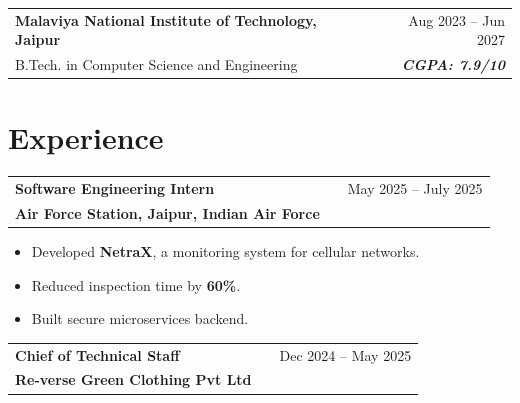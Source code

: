 \documentclass[a4paper,10pt]{article}
\begin{document}
\vspace{-2pt}



\begin{tabularx}{\linewidth}{ @{}l X r@{} }

\color[HTML]{1C033C} \textbf{Malaviya National Institute of Technology, Jaipur} & \hfill & \color[HTML]{371e77} Aug 2023 -- Jun 2027 \\

\color[HTML]{371e77} B.Tech. in Computer Science and Engineering & \hfill & \color[HTML]{4B28A4} \textit{\textbf{CGPA: 7.9/10}} \\

\end{tabularx}




\section{Experience}



\begin{tabularx}{\linewidth}{ @{}l X r@{} }

\textbf{Software Engineering Intern} & \hfill & \textcolor[HTML]{371e77}{May 2025 -- July 2025} \\

\textcolor[HTML]{371e77}{\textbf{Air Force Station, Jaipur, Indian Air Force}} & & \\

\end{tabularx}

\vspace{-6pt}

\begin{itemize}[nosep, leftmargin=1.5em]

\item Developed \textbf{NetraX}, a monitoring system for cellular networks.

\item Reduced inspection time by \textbf{60\%}.

\item Built secure microservices backend.

\end{itemize}



\begin{tabularx}{\linewidth}{ @{}l X r@{} }

\textbf{Chief of Technical Staff} & \hfill & \textcolor[HTML]{371e77}{Dec 2024 -- May 2025} \\

\textcolor[HTML]{371e77}{\textbf{Re-verse Green Clothing Pvt Ltd}} & & \\

\end{tabularx}
\end{document}
